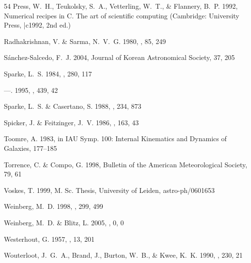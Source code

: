\documentclass[apj]{emulateapj}
\begin{document}
\begin{thebibliography}{54}
{Press}, W.~H., {Teukolsky}, S.~A., {Vetterling}, W.~T., \& {Flannery}, B.~P.
  1992, {Numerical recipes in C. The art of scientific computing} (Cambridge:
  University Press, |c1992, 2nd ed.)

{Radhakrishnan}, V. \& {Sarma}, N.~V.~G. 1980, \aap, 85, 249

{S{\'a}nchez-Salcedo}, F.~J. 2004, Journal of Korean Astronomical Society, 37,
  205

{Sparke}, L.~S. 1984, \apj, 280, 117

---. 1995, \apj, 439, 42

{Sparke}, L.~S. \& {Casertano}, S. 1988, \mnras, 234, 873

{Spicker}, J. \& {Feitzinger}, J.~V. 1986, \aap, 163, 43

{Toomre}, A. 1983, in IAU Symp. 100: Internal Kinematics and Dynamics of
  Galaxies, 177--185

Torrence, C. \& Compo, G. 1998, Bulletin of the American Meteorological
  Society, 79, 61

Voskes, T. 1999, M. Sc. Thesis, University of Leiden, astro-ph/0601653

{Weinberg}, M.~D. 1998, \mnras, 299, 499

{Weinberg}, M.~D. \& Blitz, L. 2005, \apjl, 0, 0

{Westerhout}, G. 1957, \bain, 13, 201

{Wouterloot}, J.~G.~A., {Brand}, J., {Burton}, W.~B., \& {Kwee}, K.~K. 1990,
  \aap, 230, 21

\end{thebibliography}
\end{document}
